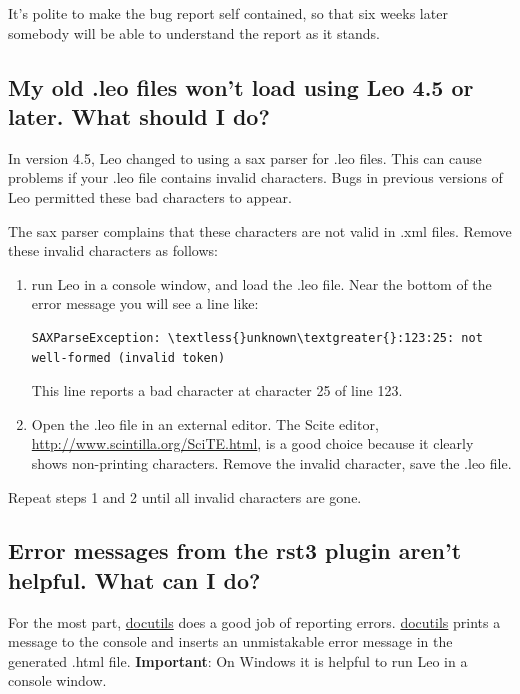 \documentclass[a4paper,10pt,english]{sphinxmanual}
\begin{document}
It's polite to make the bug report self contained, so that six weeks later
somebody will be able to understand the report as it stands.


\subsection{My old .leo files won't load using Leo 4.5 or later. What should I do?}
\label{FAQ:my-old-leo-files-won-t-load-using-leo-4-5-or-later-what-should-i-do}
In version 4.5, Leo changed to using a sax parser for .leo files. This can cause
problems if your .leo file contains invalid characters.
Bugs in previous versions of Leo permitted these bad characters to appear.

The sax parser complains that these characters are not valid in .xml files.
Remove these invalid characters as follows:
\begin{enumerate}
\item {} 
run Leo in a console window, and load the .leo file.
Near the bottom of the error message you will see a line like:

\begin{Verbatim}[commandchars=\\\{\}]
SAXParseException: \textless{}unknown\textgreater{}:123:25: not well-formed (invalid token)
\end{Verbatim}

This line reports a bad character at character 25 of line 123.

\item {} 
Open the .leo file in an external editor.
The Scite editor, \href{http://www.scintilla.org/SciTE.html}{http://www.scintilla.org/SciTE.html},
is a good choice because it clearly shows non-printing characters.
Remove the invalid character, save the .leo file.

\end{enumerate}

Repeat steps 1 and 2 until all invalid characters are gone.


\subsection{Error messages from the rst3 plugin aren't helpful. What can I do?}
\label{FAQ:error-messages-from-the-rst3-plugin-aren-t-helpful-what-can-i-do}
For the most part, \href{http://docutils.sourceforge.net/}{docutils} does a good job of reporting errors. \href{http://docutils.sourceforge.net/}{docutils} prints
a message to the console and inserts an unmistakable error message in the
generated .html file.
\textbf{Important}: On Windows it is helpful to run Leo in a console window.
\end{document}
